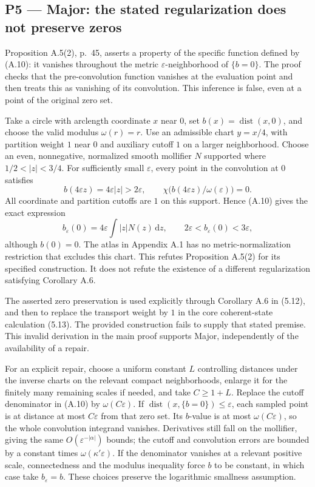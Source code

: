 \documentclass[10pt]{article}
\begin{document}
\subsection*{P5 — Major: the stated regularization does not preserve zeros}
Proposition A.5(2), p. 45, asserts a property of the specific function defined by (A.10): it vanishes throughout the metric \(\varepsilon\)-neighborhood of \(\{b=0\}\). The proof checks that the pre-convolution function vanishes at the evaluation point and then treats this as vanishing of its convolution. This inference is false, even at a point of the original zero set.\par
Take a circle with arclength coordinate \(x\) near \(0\), set \(b(x)=\operatorname{dist}(x,0)\), and choose the valid modulus \(\omega(r)=r\). Use an admissible chart \(y=x/4\), with partition weight \(1\) near \(0\) and auxiliary cutoff \(1\) on a larger neighborhood. Choose an even, nonnegative, normalized smooth mollifier \(N\) supported where \(1/2<|z|<3/4\). For sufficiently small \(\varepsilon\), every point in the convolution at \(0\) satisfies \[b(4\varepsilon z)=4\varepsilon|z|>2\varepsilon,\qquad
 \chi\bigl(b(4\varepsilon z)/\omega(\varepsilon)\bigr)=0.\] All coordinate and partition cutoffs are \(1\) on this support. Hence (A.10) gives the exact expression \[b_\varepsilon(0)=4\varepsilon\int |z|N(z)\,\mathrm dz,\qquad
              2\varepsilon<b_\varepsilon(0)<3\varepsilon ,\] although \(b(0)=0\). The atlas in Appendix A.1 has no metric-normalization restriction that excludes this chart. This refutes Proposition A.5(2) for its specified construction. It does not refute the existence of a different regularization satisfying Corollary A.6.\par
The asserted zero preservation is used explicitly through Corollary A.6 in (5.12), and then to replace the transport weight by \(1\) in the core coherent-state calculation (5.13). The provided construction fails to supply that stated premise. This invalid derivation in the main proof supports Major, independently of the availability of a repair.\par
For an explicit repair, choose a uniform constant \(L\) controlling distances under the inverse charts on the relevant compact neighborhoods, enlarge it for the finitely many remaining scales if needed, and take \(C\geq1+L\). Replace the cutoff denominator in (A.10) by \(\omega(C\varepsilon)\). If \(\operatorname{dist}(x,\{b=0\})\leq\varepsilon\), each sampled point is at distance at most \(C\varepsilon\) from that zero set. Its \(b\)-value is at most \(\omega(C\varepsilon)\), so the whole convolution integrand vanishes. Derivatives still fall on the mollifier, giving the same \(O(\varepsilon^{-|\alpha|})\) bounds; the cutoff and convolution errors are bounded by a constant times \(\omega(\kappa'\varepsilon)\). If the denominator vanishes at a relevant positive scale, connectedness and the modulus inequality force \(b\) to be constant, in which case take \(b_\varepsilon=b\). These choices preserve the logarithmic smallness assumption.\par
\end{document}
